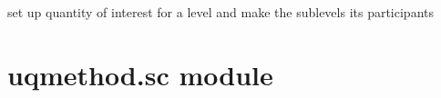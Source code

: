 \documentclass[letterpaper,10pt,english]{sphinxmanual}
\begin{document}
\begin{fulllineitems}
\begin{fulllineitems}
\end{fulllineitems}


\begin{fulllineitems}
\label{\detokenize{uqmethod:uqmethod.mlmc.Mlmc.setup_qoi}}
set up quantity of interest for a level and make the 
sublevels its participants

\end{fulllineitems}


\end{fulllineitems}



\section{uqmethod.sc module}
\label{\detokenize{uqmethod:module-uqmethod.sc}}\label{\detokenize{uqmethod:uqmethod-sc-module}}
\end{document}
